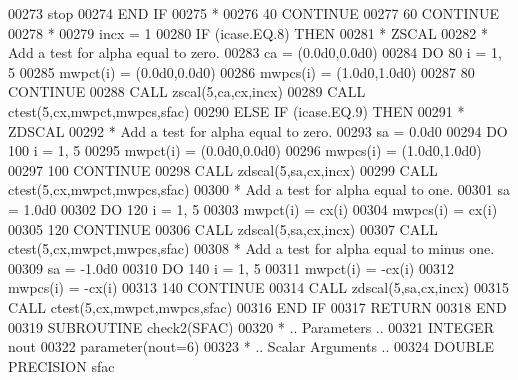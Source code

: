 \begin{DoxyCode}
00273                stop
00274 \textcolor{keywordflow}{            END IF}
00275 \textcolor{comment}{*}
00276    40    \textcolor{keywordflow}{CONTINUE}
00277    60 \textcolor{keywordflow}{CONTINUE}
00278 \textcolor{comment}{*}
00279       incx = 1
00280       \textcolor{keywordflow}{IF} (icase.EQ.8) \textcolor{keywordflow}{THEN}
00281 \textcolor{comment}{*        ZSCAL}
00282 \textcolor{comment}{*        Add a test for alpha equal to zero.}
00283          ca = (0.0d0,0.0d0)
00284          \textcolor{keywordflow}{DO} 80 i = 1, 5
00285             mwpct(i) = (0.0d0,0.0d0)
00286             mwpcs(i) = (1.0d0,1.0d0)
00287    80    \textcolor{keywordflow}{CONTINUE}
00288          \textcolor{keyword}{CALL }zscal(5,ca,cx,incx)
00289          \textcolor{keyword}{CALL }ctest(5,cx,mwpct,mwpcs,sfac)
00290       \textcolor{keywordflow}{ELSE} \textcolor{keywordflow}{IF} (icase.EQ.9) \textcolor{keywordflow}{THEN}
00291 \textcolor{comment}{*        ZDSCAL}
00292 \textcolor{comment}{*        Add a test for alpha equal to zero.}
00293          sa = 0.0d0
00294          \textcolor{keywordflow}{DO} 100 i = 1, 5
00295             mwpct(i) = (0.0d0,0.0d0)
00296             mwpcs(i) = (1.0d0,1.0d0)
00297   100    \textcolor{keywordflow}{CONTINUE}
00298          \textcolor{keyword}{CALL }zdscal(5,sa,cx,incx)
00299          \textcolor{keyword}{CALL }ctest(5,cx,mwpct,mwpcs,sfac)
00300 \textcolor{comment}{*        Add a test for alpha equal to one.}
00301          sa = 1.0d0
00302          \textcolor{keywordflow}{DO} 120 i = 1, 5
00303             mwpct(i) = cx(i)
00304             mwpcs(i) = cx(i)
00305   120    \textcolor{keywordflow}{CONTINUE}
00306          \textcolor{keyword}{CALL }zdscal(5,sa,cx,incx)
00307          \textcolor{keyword}{CALL }ctest(5,cx,mwpct,mwpcs,sfac)
00308 \textcolor{comment}{*        Add a test for alpha equal to minus one.}
00309          sa = -1.0d0
00310          \textcolor{keywordflow}{DO} 140 i = 1, 5
00311             mwpct(i) = -cx(i)
00312             mwpcs(i) = -cx(i)
00313   140    \textcolor{keywordflow}{CONTINUE}
00314          \textcolor{keyword}{CALL }zdscal(5,sa,cx,incx)
00315          \textcolor{keyword}{CALL }ctest(5,cx,mwpct,mwpcs,sfac)
00316 \textcolor{keywordflow}{      END IF}
00317       \textcolor{keywordflow}{RETURN}
00318 \textcolor{keyword}{      END}
00319 \textcolor{keyword}{      SUBROUTINE }check2(SFAC)
00320 \textcolor{comment}{*     .. Parameters ..}
00321       \textcolor{keywordtype}{INTEGER}           nout
00322       parameter(nout=6)
00323 \textcolor{comment}{*     .. Scalar Arguments ..}
00324       \textcolor{keywordtype}{DOUBLE PRECISION}  sfac

\end{DoxyCode}
